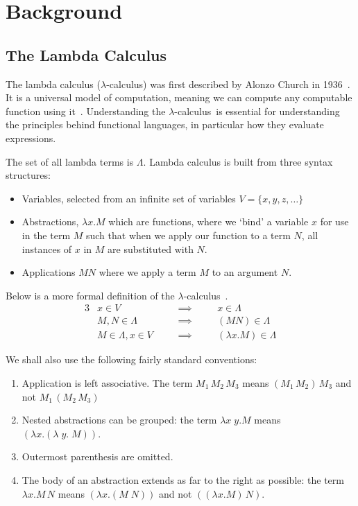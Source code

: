\chapter{Background}
\label{chap:technical}

\section{The Lambda Calculus}
\label{bg:lcalc}
\newcommand{\lcalc}{$\lambda$-calculus}
\newcommand{\lCalc}{$\lambda$-Calculus}
\newcommand{\fto}{\rightarrow}
The lambda calculus (\lcalc) was first described by Alonzo Church in 1936~\cite{church1936unsolvable}. It is a universal model of computation, meaning we can compute any computable function using it~\cite{Turing_1937}. Understanding the \lcalc\ is essential for understanding the principles behind functional languages, in particular how they evaluate expressions.

The set of all lambda terms is $\Lambda$. Lambda calculus is built from three syntax structures:
\begin{itemize}
    \item Variables, selected from an infinite set of variables $V=\{x,y,z,\dots\}$
    \item Abstractions, $\lambda x. M$ which are functions, where we `bind' a variable $x$ for use in the term $M$ such that when we apply our function to a term $N$, all instances of $x$ in $M$ are substituted with $N$.
    \item Applications $M N$ where we apply a term $M$ to an argument $N$. 
\end{itemize}

\noindent Below is a more formal definition of the \lcalc~\cite{barendregt2013lambda}.
\begin{alignat*}{3}
&x \in V                 \quad && \implies \quad && x \in \Lambda               \\
&M,N \in \Lambda         \quad && \implies \quad && (M N) \in \Lambda           \\
&M \in \Lambda, x\in V   \quad && \implies \quad && (\lambda x. M) \in \Lambda  
\end{alignat*}

\noindent We shall also use the following fairly standard conventions:

\begin{enumerate}
    \item Application is left associative. The term $M_1\,M_2\,M_3$ means $(M_1\,M_2)\,M_3$ and not $M_1\,(M_2\,M_3)$
    \item Nested abstractions can be grouped: the term $\lambda x \;y. M$ means $(\lambda x . (\lambda\;y. \;M))$.
    \item Outermost parenthesis are omitted.
    \item The body of an abstraction extends as far to the right as possible: the term $\lambda x. M\,N$ means $(\lambda x. (M\;N))$ and not $((\lambda x. M)\,N)$. 
\end{enumerate}

